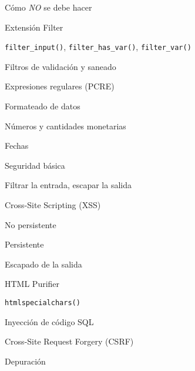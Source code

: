 \begin{longenum}
\begin{longenum}
\begin{longenum}
\begin{longenum}
\begin{longenum}
                    \item Cómo \textit{NO} se debe hacer
                    \item Extensión Filter
                    \begin{longenum}
                        \item \texttt{filter\_input()}, \texttt{filter\_has\_var()}, \texttt{filter\_var()}
                        \item Filtros de validación y saneado
                    \end{longenum}
                    \item Expresiones regulares (PCRE)
                \end{longenum}
                \item Formateado de datos
                \begin{longenum}
                    \item Números y cantidades monetarias
                    \item Fechas
                \end{longenum}
            \end{longenum}
            \item Seguridad básica
            \begin{longenum}
                \item Filtrar la entrada, escapar la salida
                \item Cross-Site Scripting (XSS)
                \begin{longenum}
                    \item No persistente
                    \item Persistente
                    \item Escapado de la salida
                    \begin{longenum}
                        \item HTML Purifier
                    \end{longenum}
                \end{longenum}
                \item \texttt{htmlspecialchars()}
            \end{longenum}
            \item Inyección de código SQL
            \item Cross-Site Request Forgery (CSRF)
        \end{longenum}
        \item Depuración

\end{longenum}
\end{longenum}
